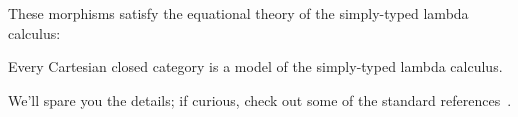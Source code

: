 These morphisms satisfy the equational theory of the simply-typed 
lambda calculus:
\begin{theorem} \label{thm:cccs}
  Every Cartesian closed category is a
  model of the simply-typed
  lambda calculus.
\end{theorem}
We'll spare you the details; if curious, check out some of the standard references~\citep{lambek1988introduction,crole1993categories}.





